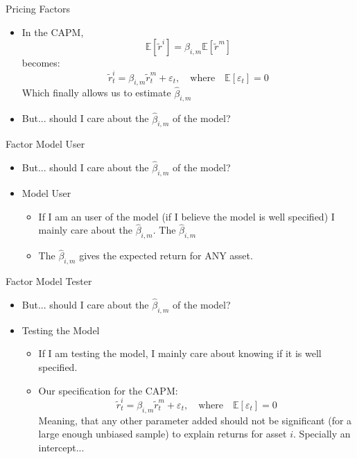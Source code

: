 \documentclass{beamer}
\begin{document}
\begin{frame}{Pricing Factors}
    \begin{itemize}
        \item In the CAPM,
        $$
        \mathbb{E}[\tilde{r}^i] = \beta_{i, m} \mathbb{E}[\tilde{r}^m] 
        $$
        becomes:
        $$
        \tilde{r}^i_t = \beta_{i, m} \tilde{r}^m_t + \varepsilon_t, \quad \text{where} \quad \mathbb{E}[\varepsilon_t] = 0
        $$
        Which finally allows us to estimate $\hat{\beta}_{i, m}$
        \item But... should I care about the $\hat{\beta}_{i, m}$ of the model?
    \end{itemize}
\end{frame}

\begin{frame}{Factor Model User}
    \begin{itemize}
        \item But... should I care about the $\hat{\beta}_{i, m}$ of the model?
        \item Model User
        \begin{itemize}
            \item If I am an user of the model (if I believe the model is well specified) I mainly care about the $\hat{\beta}_{i, m}$. The $\hat{\beta}_{i, m}$ 
            \item The $\hat{\beta}_{i, m}$ gives the expected return for ANY asset.
        \end{itemize}
    \end{itemize}
\end{frame}

\begin{frame}{Factor Model Tester}
    \begin{itemize}
        \item But... should I care about the $\hat{\beta}_{i, m}$ of the model?
        \item Testing the Model
        \begin{itemize}
            \item If I am testing the model, I mainly care about knowing if it is well specified.
            \item Our specification for the CAPM:
            $$
            \tilde{r}^i_t = \beta_{i, m} \tilde{r}^m_t + \varepsilon_t, \quad \text{where} \quad \mathbb{E}[\varepsilon_t] = 0
            $$
            Meaning, that any other parameter added should not be significant (for a large enough unbiased sample) to explain returns for asset $i$. Specially an intercept...
        \end{itemize}
    \end{itemize}
\end{frame}
\end{document}
